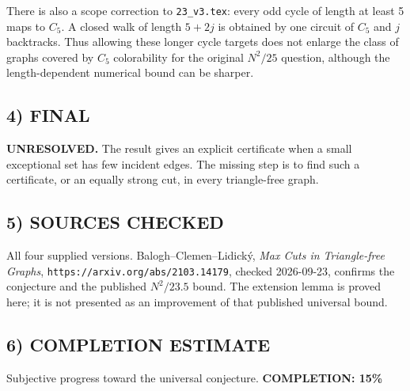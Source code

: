 There is also a scope correction to \texttt{23\_v3.tex}: every odd cycle of length at least 5 maps to $C_5$. A closed walk of length $5+2j$ is obtained by one circuit of $C_5$ and $j$ backtracks. Thus allowing these longer cycle targets does not enlarge the class of graphs covered by $C_5$ colorability for the original $N^2/25$ question, although the length-dependent numerical bound can be sharper.
\subsection*{4) FINAL}
\textbf{UNRESOLVED.} The result gives an explicit certificate when a small exceptional set has few incident edges. The missing step is to find such a certificate, or an equally strong cut, in every triangle-free graph.
\subsection*{5) SOURCES CHECKED}
All four supplied versions. Balogh--Clemen--Lidick\'y, \emph{Max Cuts in Triangle-free Graphs}, \texttt{https://arxiv.org/abs/2103.14179}, checked 2026-09-23, confirms the conjecture and the published $N^2/23.5$ bound. The extension lemma is proved here; it is not presented as an improvement of that published universal bound.
\subsection*{6) COMPLETION ESTIMATE}
Subjective progress toward the universal conjecture.
\textbf{COMPLETION: 15\%}
